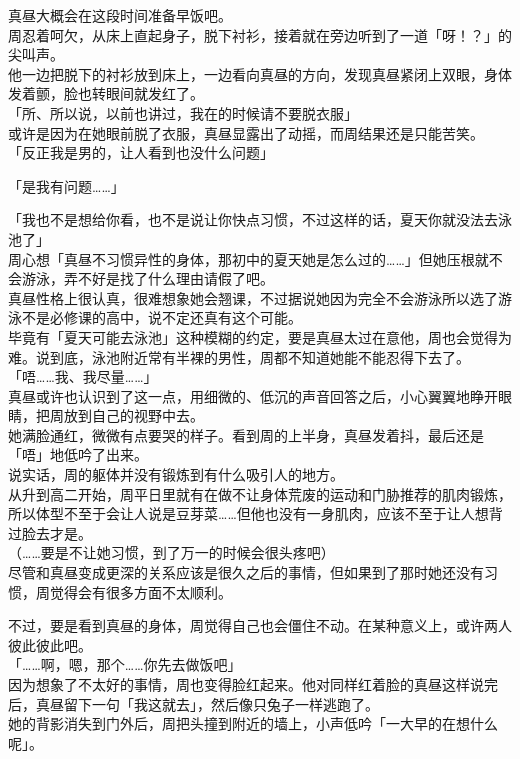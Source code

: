 真昼大概会在这段时间准备早饭吧。\\

周忍着呵欠，从床上直起身子，脱下衬衫，接着就在旁边听到了一道「呀！？」的尖叫声。\\

他一边把脱下的衬衫放到床上，一边看向真昼的方向，发现真昼紧闭上双眼，身体发着颤，脸也转眼间就发红了。\\

「所、所以说，以前也讲过，我在的时候请不要脱衣服」\\

或许是因为在她眼前脱了衣服，真昼显露出了动摇，而周结果还是只能苦笑。\\

「反正我是男的，让人看到也没什么问题」

「是我有问题……」

「我也不是想给你看，也不是说让你快点习惯，不过这样的话，夏天你就没法去泳池了」\\

周心想「真昼不习惯异性的身体，那初中的夏天她是怎么过的……」但她压根就不会游泳，弄不好是找了什么理由请假了吧。\\

真昼性格上很认真，很难想象她会翘课，不过据说她因为完全不会游泳所以选了游泳不是必修课的高中，说不定还真有这个可能。\\

毕竟有「夏天可能去泳池」这种模糊的约定，要是真昼太过在意他，周也会觉得为难。说到底，泳池附近常有半裸的男性，周都不知道她能不能忍得下去了。\\

「唔……我、我尽量……」\\

真昼或许也认识到了这一点，用细微的、低沉的声音回答之后，小心翼翼地睁开眼睛，把周放到自己的视野中去。\\

她满脸通红，微微有点要哭的样子。看到周的上半身，真昼发着抖，最后还是「唔」地低吟了出来。\\

说实话，周的躯体并没有锻炼到有什么吸引人的地方。\\

从升到高二开始，周平日里就有在做不让身体荒废的运动和门胁推荐的肌肉锻炼，所以体型不至于会让人说是豆芽菜……但他也没有一身肌肉，应该不至于让人想背过脸去才是。\\

（……要是不让她习惯，到了万一的时候会很头疼吧）\\

尽管和真昼变成更深的关系应该是很久之后的事情，但如果到了那时她还没有习惯，周觉得会有很多方面不太顺利。

不过，要是看到真昼的身体，周觉得自己也会僵住不动。在某种意义上，或许两人彼此彼此吧。\\

「……啊，嗯，那个……你先去做饭吧」\\

因为想象了不太好的事情，周也变得脸红起来。他对同样红着脸的真昼这样说完后，真昼留下一句「我这就去」，然后像只兔子一样逃跑了。\\

她的背影消失到门外后，周把头撞到附近的墙上，小声低吟「一大早的在想什么呢」。
